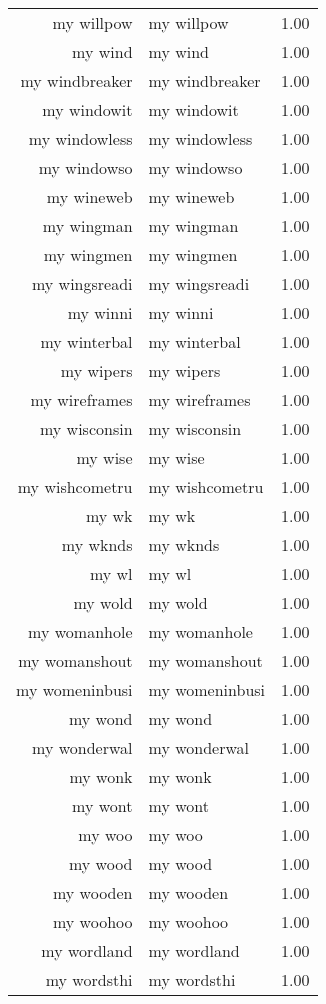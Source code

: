 \begin{table}[ht]
\begin{tabular}{rlr}
  my willpow & my willpow & 1.00 \\ 
  my wind & my wind & 1.00 \\ 
  my windbreaker & my windbreaker & 1.00 \\ 
  my windowit & my windowit & 1.00 \\ 
  my windowless & my windowless & 1.00 \\ 
  my windowso & my windowso & 1.00 \\ 
  my wineweb & my wineweb & 1.00 \\ 
  my wingman & my wingman & 1.00 \\ 
  my wingmen & my wingmen & 1.00 \\ 
  my wingsreadi & my wingsreadi & 1.00 \\ 
  my winni & my winni & 1.00 \\ 
  my winterbal & my winterbal & 1.00 \\ 
  my wipers & my wipers & 1.00 \\ 
  my wireframes & my wireframes & 1.00 \\ 
  my wisconsin & my wisconsin & 1.00 \\ 
  my wise & my wise & 1.00 \\ 
  my wishcometru & my wishcometru & 1.00 \\ 
  my wk & my wk & 1.00 \\ 
  my wknds & my wknds & 1.00 \\ 
  my wl & my wl & 1.00 \\ 
  my wold & my wold & 1.00 \\ 
  my womanhole & my womanhole & 1.00 \\ 
  my womanshout & my womanshout & 1.00 \\ 
  my womeninbusi & my womeninbusi & 1.00 \\ 
  my wond & my wond & 1.00 \\ 
  my wonderwal & my wonderwal & 1.00 \\ 
  my wonk & my wonk & 1.00 \\ 
  my wont & my wont & 1.00 \\ 
  my woo & my woo & 1.00 \\ 
  my wood & my wood & 1.00 \\ 
  my wooden & my wooden & 1.00 \\ 
  my woohoo & my woohoo & 1.00 \\ 
  my wordland & my wordland & 1.00 \\ 
  my wordsthi & my wordsthi & 1.00 \\ 

\end{tabular}
\end{table}
